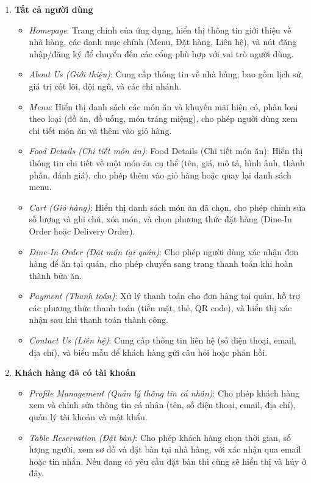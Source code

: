 \begin{enumerate}
    \item \textbf{Tất cả người dùng}
        \begin{itemize}
            \item \textit{Homepage}: Trang chính của ứng dụng, hiển thị thông tin giới thiệu về nhà hàng, các danh mục chính (Menu, Đặt hàng, Liên hệ), và nút đăng nhập/đăng ký để chuyển đến các cổng phù hợp với vai trò người dùng.
            \item \textit{About Us (Giới thiệu)}: Cung cấp thông tin về nhà hàng, bao gồm lịch sử, giá trị cốt lõi, đội ngũ, và các chi nhánh.
            \item \textit{Menu}: Hiển thị danh sách các món ăn và khuyến mãi hiện có, phân loại theo loại (đồ ăn, đồ uống, món tráng miệng), cho phép người dùng xem chi tiết món ăn và thêm vào giỏ hàng.
            \item \textit{Food Details (Chi tiết món ăn)}: Food Details (Chi tiết món ăn): Hiển thị thông tin chi tiết về một món ăn cụ thể (tên, giá, mô tả, hình ảnh, thành phần, đánh giá), cho phép thêm vào giỏ hàng hoặc quay lại danh sách menu.
            \item \textit{Cart (Giỏ hàng)}: Hiển thị danh sách món ăn đã chọn, cho phép chỉnh sửa số lượng và ghi chú, xóa món, và chọn phương thức đặt hàng (Dine-In Order hoặc Delivery Order).
            \item \textit{Dine-In Order (Đặt món tại quán)}: Cho phép người dùng xác nhận đơn hàng để ăn tại quán, cho phép chuyển sang trang thanh toán khi hoàn thành bữa ăn.
            \item \textit{Payment (Thanh toán)}: Xử lý thanh toán cho đơn hàng tại quán, hỗ trợ các phương thức thanh toán (tiền mặt, thẻ, QR code), và hiển thị xác nhận sau khi thanh toán thành công.
            \item \textit{Contact Us (Liên hệ)}: Cung cấp thông tin liên hệ (số điện thoại, email, địa chỉ), và biểu mẫu để khách hàng gửi câu hỏi hoặc phản hồi.
        \end{itemize}
    \item \textbf{Khách hàng đã có tài khoản}
        \begin{itemize}
            \item \textit{Profile Management (Quản lý thông tin cá nhân)}: Cho phép khách hàng xem và chỉnh sửa thông tin cá nhân (tên, số điện thoại, email, địa chỉ), quản lý tài khoản và mật khẩu.
            \item \textit{Table Reservation (Đặt bàn)}: Cho phép khách hàng chọn thời gian, số lượng người, xem sơ đồ và đặt bàn tại nhà hàng, với xác nhận qua email hoặc tin nhắn. Nếu đang có yêu cầu đặt bàn thì cũng sẽ hiển thị và hủy ở đây.

\end{itemize}
\end{enumerate}
